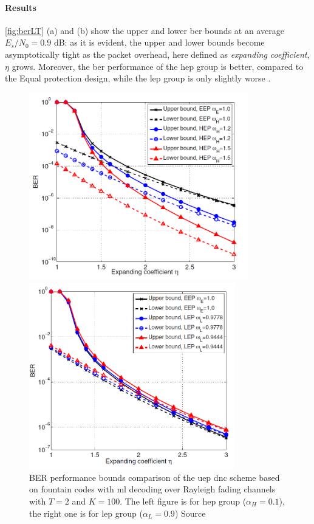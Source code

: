 \paragraph{Results}
\autoref{fig:berLT} (a) and (b) show the upper and lower \gls{ber} bounds at an average $E_s/N_0 = 0.9$ dB: as it is evident, the upper and lower bounds become asymptotically tight as the packet overhead, here defined as \textit{expanding coefficient}, $\eta$ grows. Moreover, the \gls{ber} performance of the \gls{hep} group is better, compared to the Equal protection design, while the \gls{lep} group is only slightly worse \cite{Yue2014}.
\begin{figure}
\centering
\begin{minipage}[c]{0.47\textwidth}
  \includegraphics[width = 0.85\textwidth]{img/bounds_14a}
\end{minipage}
\begin{minipage}[c]{0.47\textwidth}
  \includegraphics[width = 0.8\textwidth]{img/bounds_14b}
\end{minipage}
\caption{\footnotesize{BER performance bounds comparison of the \gls{uep} \gls{dnc} scheme based on fountain codes with \gls{ml} decoding over Rayleigh fading channels with $T=2$ and $K=100$. The left figure is for \gls{hep} group ($\alpha_H = 0.1$), the right one is for \gls{lep} group ($\alpha_L = 0.9$) Source \cite{Yue2014}}}
\label{fig:berLT}
\end{figure}
